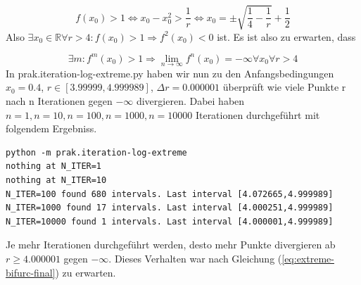 \documentclass[12pt,a4paper]{article}
\begin{document}
\begin{equation}
f(x_0) > 1 \iff x_0-x_0^2 > \frac{1}{r} \iff x_0 = \pm \sqrt{\frac{1}{4}-\frac{1}{r}} + \frac{1}{2}
\end{equation}
Also $\exists x_0 \in \mathbb{R} \forall r > 4: f(x_0) > 1 \Rightarrow f^2(x_0) < 0$ ist. Es ist also zu erwarten, dass 

\begin{equation}
\exists m : f^m(x_0) > 1 \Rightarrow
\lim_{n \rightarrow \infty} f^n(x_0) = -\infty \forall x_0 \forall r > 4
\label{eq:extreme-bifurc-final}
\end{equation}
In prak.iteration-log-extreme.py haben wir nun zu den Anfangsbedingungen $x_0=0.4$, $r \in [3.99999, 4.999989]$, $\Delta r = 0.000001$ überprüft wie viele Punkte r nach n Iterationen gegen $-\infty$ divergieren. Dabei haben $n=1, n=10, n=100, n=1000, n=10000$ Iterationen durchgeführt mit folgendem Ergebniss.

\begin{lstlisting}
python -m prak.iteration-log-extreme
nothing at N_ITER=1
nothing at N_ITER=10
N_ITER=100 found 680 intervals. Last interval [4.072665,4.999989]
N_ITER=1000 found 17 intervals. Last interval [4.000251,4.999989]
N_ITER=10000 found 1 intervals. Last interval [4.000001,4.999989]
\end{lstlisting}

Je mehr Iterationen durchgeführt werden, desto mehr Punkte divergieren ab $r \geq 4.000001$ gegen $-\infty$. Dieses Verhalten war nach Gleichung (\ref{eq:extreme-bifurc-final}) zu erwarten. 
\end{document}
